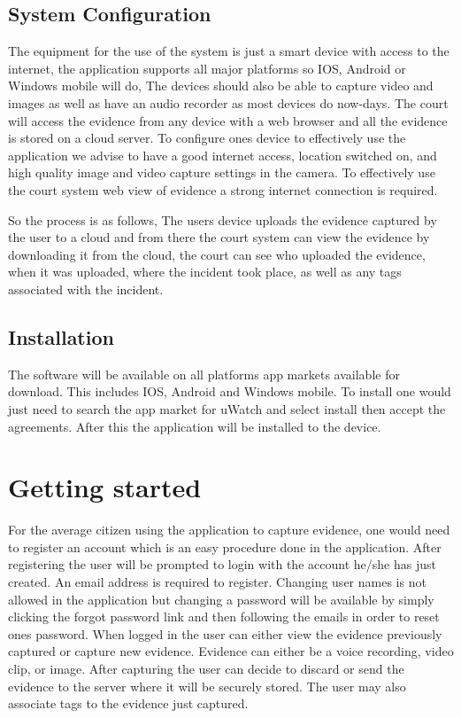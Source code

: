 \documentclass[a4paper,12pt]{article}
\begin{document}
\subsection{System Configuration}
The equipment for the use of the system is just a smart device with access to the internet, the application supports all major platforms so IOS, Android or Windows mobile will do, The devices should also be able to capture video and images as well as have an audio recorder as most devices do now-days. The court will access the evidence from any device with a web browser and all the evidence is stored on a cloud server. To configure ones device to effectively use the application we advise to have a good internet access, location switched on, and high quality image and video capture settings in the camera. To effectively use the court system web view of evidence a strong internet connection is required.

So the process is as follows, The users device uploads the evidence captured by the user to a cloud and from there the court system can view the evidence by downloading it from the cloud, the court can see who uploaded the evidence, when it was uploaded, where the incident took place, as well as any tags associated with the incident.

\subsection{Installation}
The software will be available on all platforms app markets available for download. This includes IOS, Android and Windows mobile. To install one would just need to search the app market for uWatch and select install then accept the agreements. After this the application will be installed to the device. 

\section{Getting started}
For the average citizen using the application to capture evidence, one would need to register an account which is an easy procedure done in the application. After registering the user will be prompted to login with the account he/she has just created. An email address is required to register. Changing user names is not allowed in the application but changing a password will be available by simply clicking the forgot password link and then following the emails in order to reset ones password. When logged in the user can either view the evidence previously captured or capture new evidence. Evidence can either be a voice recording, video clip, or image. After capturing the user can decide to discard or send the evidence to the server where it will be securely stored. The user may also associate tags to the evidence just captured. 
\end{document}
